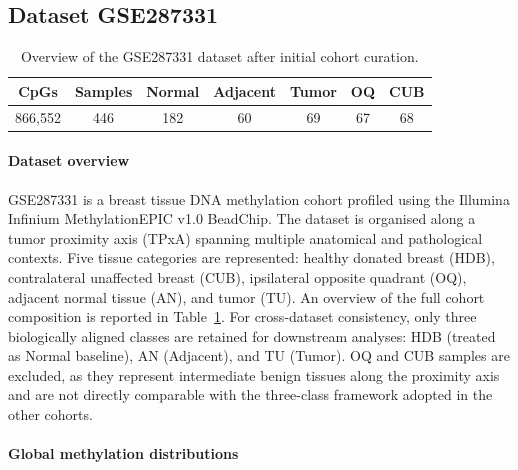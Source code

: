 \subsection{Dataset GSE287331}
\label{subsec:gse287331}

\begin{table}[t]
\centering
\caption{Overview of the GSE287331 dataset after initial cohort curation.}
\label{tab:gse287331_overview}
\scriptsize
\begin{tabular}{c c c c c c c}
\toprule
\textbf{CpGs} &
\textbf{Samples} &
\textbf{Normal} &
\textbf{Adjacent} &
\textbf{Tumor} &
\textbf{OQ} &
\textbf{CUB} \\
\midrule
866{,}552 &
446 &
182 &
60 &
69 &
67 &
68 \\
\bottomrule
\end{tabular}
\end{table}


\paragraph{Dataset overview}
\label{par:gse287331_overview}

GSE287331 is a breast tissue DNA methylation cohort profiled using the
Illumina Infinium MethylationEPIC v1.0 BeadChip.
The dataset
is organised along a tumor proximity axis (TPxA) spanning multiple
anatomical and pathological contexts.
Five tissue categories are represented:
healthy donated breast (HDB), contralateral unaffected breast (CUB),
ipsilateral opposite quadrant (OQ), adjacent normal tissue (AN),
and tumor (TU). An overview of the full cohort composition is
reported in Table~\ref{tab:gse287331_overview}.
For cross-dataset consistency, only three biologically aligned classes
are retained for downstream analyses:
HDB (treated as Normal baseline),
AN (Adjacent),
and TU (Tumor).
OQ and CUB samples are excluded, as they represent intermediate
benign tissues along the proximity axis and are not directly
comparable with the three-class framework adopted in the other cohorts.



\paragraph{Global methylation distributions}
\label{par:gse287331_global_meth}

